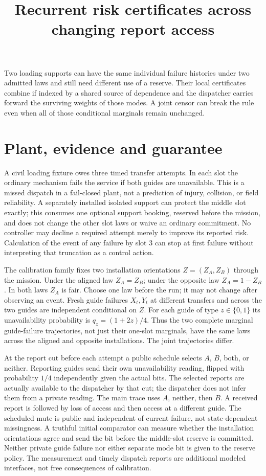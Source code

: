 \documentclass[11pt]{article}
\title{Recurrent risk certificates across changing report access}
\date{}
\begin{document}
\maketitle

Two loading supports can have the same individual failure histories under two admitted laws and still need different use of a reserve. Their local certificates combine if indexed by a shared source of dependence and the dispatcher carries forward the surviving weights of those modes. A joint censor can break the rule even when all of those conditional marginals remain unchanged.

\section{Plant, evidence and guarantee}
A civil loading fixture owes three timed transfer attempts. In each slot the ordinary mechanism fails the service if both guides are unavailable. This is a missed dispatch in a fail-closed plant, not a prediction of injury, collision, or field reliability. A separately installed isolated support can protect the middle slot exactly; this consumes one optional support booking, reserved before the mission, and does not change the other slot laws or waive an ordinary commitment. No controller may decline a required attempt merely to improve its reported risk. Calculation of the event of any failure by slot 3 can stop at first failure without interpreting that truncation as a control action.

The calibration family fixes two installation orientations $Z=(Z_A,Z_B)$ through the mission. Under the aligned law $Z_A=Z_B$; under the opposite law $Z_A=1-Z_B$. In both laws $Z_A$ is fair. Choose one law before the run; it may not change after observing an event. Fresh guide failures $X_t,Y_t$ at different transfers and across the two guides are independent conditional on $Z$. For each guide of type $z\in\{0,1\}$ its unavailability probability is $q_z=(1+2z)/4$. Thus the two complete marginal guide-failure trajectories, not just their one-slot marginals, have the same laws across the aligned and opposite installations. The joint trajectories differ.

At the report cut before each attempt a public schedule selects $A$, $B$, both, or neither. Reporting guides send their own unavailability reading, flipped with probability $1/4$ independently given the actual bits. The selected reports are actually available to the dispatcher by that cut; the dispatcher does not infer them from a private reading. The main trace uses $A$, neither, then $B$. A received report is followed by loss of access and then access at a different guide. The scheduled mute is public and independent of current failure, not state-dependent missingness. A truthful initial comparator can measure whether the installation orientations agree and send the bit before the middle-slot reserve is committed. Neither private guide failure nor either separate mode bit is given to the reserve policy. The measurement and timely dispatch reports are additional modeled interfaces, not free consequences of calibration.
\end{document}
